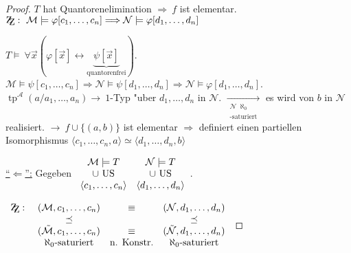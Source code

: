 \documentclass[a4paper,12pt,numbers=noenddot,parskip=full]{scrartcl}
\newcommand{\Forall}{~\forall}
\newcommand{\scrA}{\mathcal{A}}
\newcommand{\scrM}{\mathcal{M}}
\newcommand{\scrN}{\mathcal{N}}
\newcommand{\zz}{\mathrm{Z\kern-.3em\raise-0.5ex\hbox{Z}}:~}
\DeclareMathOperator{\typ}{tp}
\theoremstyle{dotless}
\begin{document}
\begin{proof}
\begin{tikzpicture}[x=0.75pt,y=0.75pt,yscale=-1,xscale=1]
	
	\end{tikzpicture}
	
	$T$ hat Quantorenelimination $\Longrightarrow~f$ ist elementar.\\
	$\zz \scrM \models \varphi[c_1, \dots, c_n] \Longrightarrow \scrN \models \varphi[d_1, \dots, d_n]$
	
	$T\models \Forall \vec{x} (\varphi[\vec{x}] \leftrightarrow \underbrace{\psi[\vec{x}]}_\text{quantorenfrei})$. $\scrM \models \psi[c_1, \dots, c_n] \Rightarrow \scrN \models \psi[d_1, \dots, d_n] \Rightarrow \scrN \models \varphi[d_1, \dots, d_n]$.\\
	$\typ^\scrA(a/a_1, \dots, a_n) \longrightarrow~ 1$-Typ "uber $d_1, \dots, d_n$ in $\scrN$. $\underset{\substack{\scrN~\aleph_0\\\text{-saturiert}}}{\longrightarrow}$ es wird von $b$ in $\scrN$ realisiert. $\longrightarrow~ f \cup \{(a,b)\}$ ist elementar $\Rightarrow$ definiert einen partiellen Isomorphismus $\langle c_1, \dots, c_n,a \rangle \simeq \langle d_1, \dots, d_n ,b \rangle$
	
	\underline{"`$\Leftarrow$"':} Gegeben $\begin{array}{c c}
		\scrM \models T &\scrN \models T\\
		\cup ~\text{US} &\cup ~\text{US}\\
		\langle c_{1} ,\dots ,c_{n} \rangle &\langle d_{1} ,\dots ,d_{n} \rangle
	\end{array}$. 
	
	$\begin{array}{c c c c}
		\zz &(\scrM, c_1, \dots, c_n)&\equiv &(\scrN, d_1, \dots, d_n)\\
		\phantom{x}&\preceq &\phantom{x} &\preceq\\
		\phantom{x}&(\tilde{\scrM}, c_1, \dots, c_n) &\equiv &(\tilde{\scrN}, d_1, \dots, d_n)\\
		\phantom{x}&\aleph_0 \text{-saturiert} &\text{n. Konstr.} &\aleph_0 \text{-saturiert}
	\end{array}$
	
\end{proof}
\end{document}
